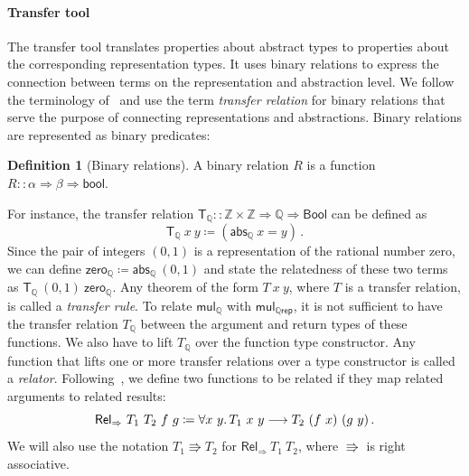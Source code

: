 \documentclass{article}
\theoremstyle{definition}
\newtheorem{definition}{Definition}[section]
\newcommand{\bool}{\mathsf{Bool}}
\newcommand{\relfun}{\mathsf{Rel_\Rightarrow}}
\newcommand{\rel}{\mathsf{Rel}}
\newcommand{\inte}{\mathbb{Z}}
\newcommand{\rat}{\mathbb{Q}}
\newcommand{\abs}{\mathsf{abs}}
\begin{document}
\paragraph{Transfer tool} The transfer tool translates properties about abstract types to properties about the corresponding representation types.
It uses binary relations to express the connection between terms on the representation and abstraction level.
We follow the terminology of~\cite{huffman2013lifting}
and use the term \textit{transfer relation} for binary relations that serve the purpose of connecting representations and abstractions.
Binary relations are represented as binary predicates:
\begin{definition}[Binary relations]
	A binary relation $R$ is a function \(R :: \alpha \Rightarrow \beta \Rightarrow \mathsf{bool}\).
\end{definition}
For instance, the transfer relation \(\mathsf{T_\rat} :: \inte \times \inte \Rightarrow \rat \Rightarrow \bool\) can be defined as
\begin{equation}\label{eq:trans-rel-rat}
	\mathsf{T_\rat}\ x\ y \coloneqq (\abs_\rat\ x = y)\,.
\end{equation}
Since the pair of integers \((0, 1)\) is a representation of the rational number zero,
we can define \(\mathsf{zero_\rat}\coloneqq\abs_\rat\ (0, 1)\) and state the relatedness of these two terms as \(\mathsf{T_\rat}\ (0, 1)\ \mathsf{zero_\rat}\).
Any theorem of the form \(T\ x\ y\),
where \(T\) is a transfer relation,
is called a \emph{transfer rule}.
To relate \(\mathsf{mul_\rat}\) with \(\mathsf{mul_{\rat rep}}\),
it is not sufficient to have the transfer relation $T_\rat$ between the argument and return types of these functions.
We also have to lift \(T_\rat\) over the function type constructor.
Any function that lifts one or more transfer relations over a type constructor is called
a \emph{relator}.
Following~\cite{wadler1989theorems},
we define two functions
to be related if they map related arguments to related results:
\begin{equation*}
	\rel_\Rightarrow\ T_1\ T_2\ f\ g \coloneqq \forall x\ y\ldotp T_1\ x\ y \longrightarrow T_2\ (f\ x)\ (g\ y)\,.
\end{equation*}
We will also use the notation \(T_1 \Rrightarrow T_2\) for \(\relfun\ T_1\ T_2\), where \(\Rrightarrow\) is right associative.
\end{document}
